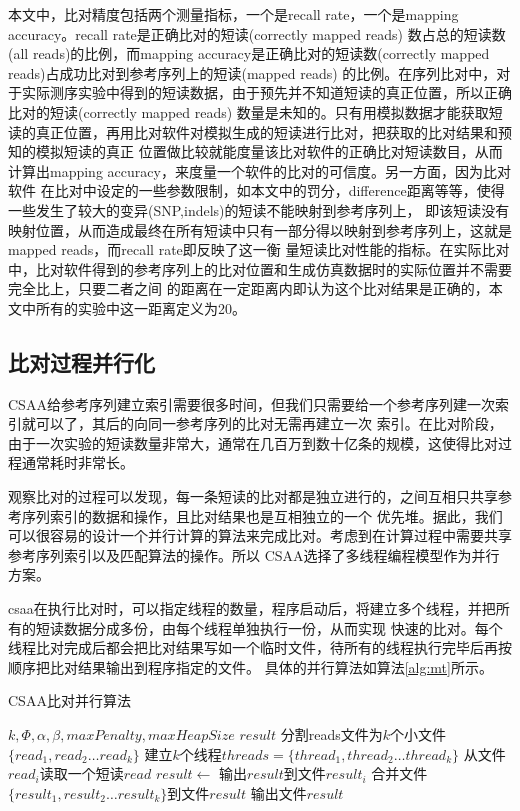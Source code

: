 \documentclass[UTF8,adobefonts]{ctexart}
\begin{document}
本文中，比对精度包括两个测量指标，一个是recall rate，一个是mapping accuracy。recall rate是正确比对的短读(correctly mapped reads)
数占总的短读数(all reads)的比例，而mapping accuracy是正确比对的短读数(correctly mapped reads)占成功比对到参考序列上的短读(mapped reads)
的比例。在序列比对中，对于实际测序实验中得到的短读数据，由于预先并不知道短读的真正位置，所以正确比对的短读(correctly mapped reads)
数量是未知的。只有用模拟数据才能获取短读的真正位置，再用比对软件对模拟生成的短读进行比对，把获取的比对结果和预知的模拟短读的真正
位置做比较就能度量该比对软件的正确比对短读数目，从而计算出mapping accuracy，来度量一个软件的比对的可信度。另一方面，因为比对软件
在比对中设定的一些参数限制，如本文中的罚分，difference距离等等，使得一些发生了较大的变异(SNP,indels)的短读不能映射到参考序列上，
即该短读没有映射位置，从而造成最终在所有短读中只有一部分得以映射到参考序列上，这就是mapped reads，而recall rate即反映了这一衡
量短读比对性能的指标。在实际比对中，比对软件得到的参考序列上的比对位置和生成仿真数据时的实际位置并不需要完全比上，只要二者之间
的距离在一定距离内即认为这个比对结果是正确的，本文中所有的实验中这一距离定义为20。

\subsection{比对过程并行化}
CSAA给参考序列建立索引需要很多时间，但我们只需要给一个参考序列建一次索引就可以了，其后的向同一参考序列的比对无需再建立一次
索引。在比对阶段，由于一次实验的短读数量非常大，通常在几百万到数十亿条的规模，这使得比对过程通常耗时非常长。

观察比对的过程可以发现，每一条短读的比对都是独立进行的，之间互相只共享参考序列索引的数据和操作，且比对结果也是互相独立的一个
优先堆。据此，我们可以很容易的设计一个并行计算的算法来完成比对。考虑到在计算过程中需要共享参考序列索引以及匹配算法的操作。所以
CSAA选择了多线程编程模型作为并行方案。

csaa在执行比对时，可以指定线程的数量，程序启动后，将建立多个线程，并把所有的短读数据分成多份，由每个线程单独执行一份，从而实现
快速的比对。每个线程比对完成后都会把比对结果写如一个临时文件，待所有的线程执行完毕后再按顺序把比对结果输出到程序指定的文件。
具体的并行算法如算法\ref{alg:mt}所示。

\begin{algorithm}
    \caption{CSAA比对并行算法}
    \label{alg:mt}
    \begin{algorithmic}[1]
        \Require $k,\Phi,\alpha,\beta,maxPenalty,maxHeapSize$
        \Ensure $result$
        \State 分割reads文件为$k$个小文件$\{read_1,read_2 \ldots read_k \}$
        \State 建立$k$个线程$threads=\{thread_1,thread_2\ldots thread_k\}$
            \State 从文件$read_i$读取一个短读$read$
            \State {}
            \State $result \gets $ 
            \State 输出$result$到文件$result_i$
        \EndFor
        \State 合并文件$\{result_1,result_2\ldots result_k\}$到文件$result$
        \State 输出文件$result$
        \EndFunction
    \end{algorithmic}
\end{algorithm}
\end{document}
